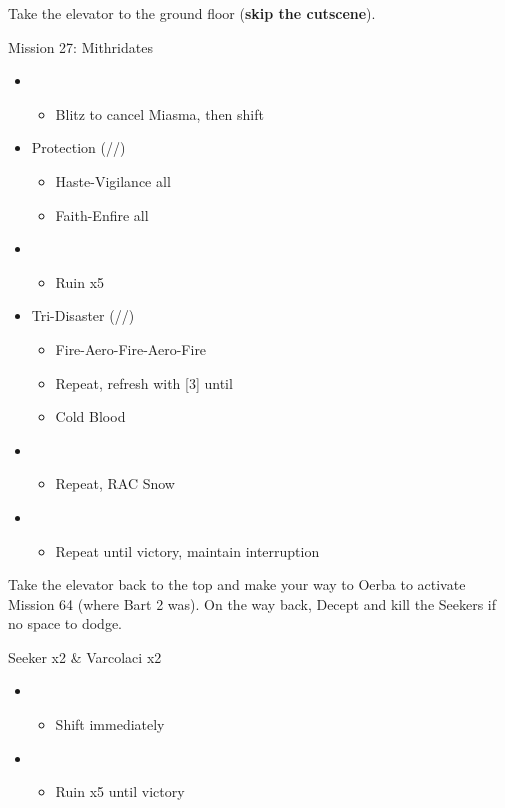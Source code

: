 \renewcommand{\first}{[1] Tri-Disaster (\rav/\rav/\rav)}
\renewcommand{\fifth}{[5] Protection (\syn/\sen/\med)}

Take the elevator to the ground floor (\textbf{skip the cutscene}).
\vfill

\begin{battle}{Mission 27: Mithridates}
	\begin{itemize}
		\item \fourth
			\begin{itemize}
				\item Blitz to cancel Miasma, then shift
			\end{itemize}
		\item \fifth
			\begin{itemize}
				\item Haste-Vigilance all
				\item Faith-Enfire all
			\end{itemize}
		\item \fourth
			\begin{itemize}
				\item Ruin x5
			\end{itemize}
		\item \first
			\begin{itemize}
				\item Fire-Aero-Fire-Aero-Fire
				\item Repeat, refresh with [3] until \stagger
				\item Cold Blood
			\end{itemize}
		\item \sixth
			\begin{itemize}
				\item Repeat, RAC Snow
			\end{itemize}
		\item \second
			\begin{itemize}
				\item Repeat until victory, maintain interruption
			\end{itemize}
	\end{itemize}
\end{battle}

Take the elevator back to the top and make your way to Oerba to activate Mission 64 (where Bart 2 was).
On the way back, Decept and kill the Seekers if no space to dodge.

\begin{battle}{Seeker x2 \& Varcolaci x2}
	\begin{itemize}
		\item \fourth
			\begin{itemize}
				\item Shift immediately
			\end{itemize}
		\item \second
			\begin{itemize}
				\item Ruin x5 until victory
			\end{itemize}
	\end{itemize}
\end{battle}

